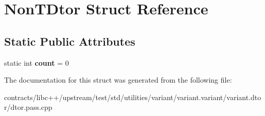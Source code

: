 \hypertarget{struct_non_t_dtor}{}\section{Non\+T\+Dtor Struct Reference}
\label{struct_non_t_dtor}
\subsection*{Static Public Attributes}
\begin{DoxyCompactItemize}
\item 
\mbox{\label{struct_non_t_dtor_a6512c2c972e90c8c9f2003675ee28d88}} 
static int {\bfseries count} = 0
\end{DoxyCompactItemize}


The documentation for this struct was generated from the following file\+:\begin{DoxyCompactItemize}
\item 
contracts/libc++/upstream/test/std/utilities/variant/variant.\+variant/variant.\+dtor/dtor.\+pass.\+cpp\end{DoxyCompactItemize}
